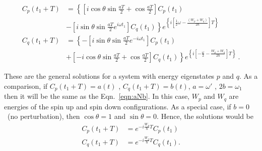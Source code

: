 \begin{align}
  C_p(t_1+T)&= \left\lbrace \left[
              i \cos \theta \sin \frac{aT}{2}+\cos \frac{aT}{2} \right] C_p(t_1)\right. \\ \nonumber
  &-
 \left . \left[i \sin \theta \sin \frac{aT}{2} e^{i \omega t_1} \right]C_q(t_1) \right\rbrace 
  e^{\left\lbrace i\left[\frac{1}{2}\omega - \frac{(W_p + W_q)}{2\hbar}\right] T\right\rbrace}
\\ \nonumber
  C_q(t_1+T)&=\left\lbrace - \left[ i \sin \theta \sin \frac{aT}{2} e^{-i \omega t_1}\right]C_p(t_1) \right . \\ \nonumber
  &+
\left .  \left[-i \cos \theta \sin \frac{aT}{2}+ \cos \frac{aT}{2}\right] C_q(t_1)\right\rbrace
  e^{\left\lbrace i \left[ -\frac{\omega}{2}- \frac{W_p+W_q}{2\hbar} \right] T \right\rbrace}~.
\end{align}

These are the general solutions for a system with energy eigenstates
$p$ and $q$.  As a comparison, if $C_p(t_1+T)=a(t)$ ,
$C_q(t_1+T)=b(t)$, $a= \omega'$ , $2b=\omega_1$ then it will be the
same as the Eqn.~\ref{eqn:aNb}. In this case, $W_p$ and $W_q$ are
energies of the spin up and spin down configurations.
As a special case, if $b=0$~(no perturbation), then $\cos \theta=1$ and
$\sin \theta=0$. Hence, the solutions would be
\begin{align}
C_p(t_1+T) &= e^{-i \frac{W_p}{\hbar} T} C_p(t_1) \\ \nonumber
C_q(t_1+T) &=e^{-i \frac{W_q}{\hbar}T} C_q(t_1).
\end{align}

